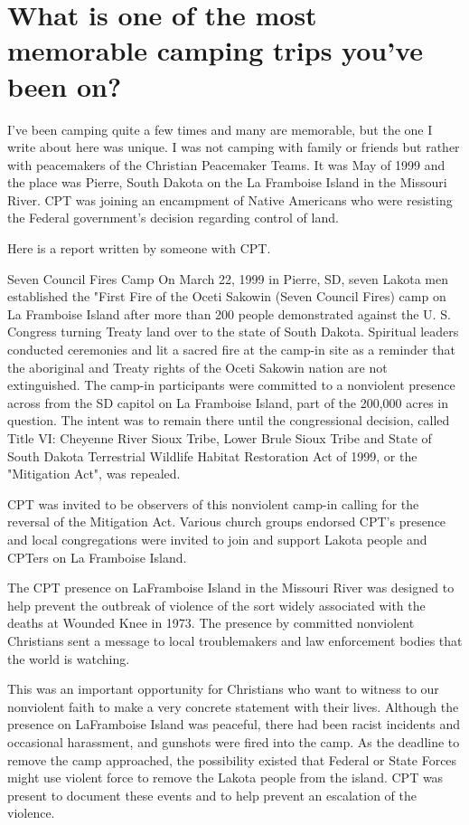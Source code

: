 \section{What is one of the most memorable camping trips you've been on?}
I've been camping quite a few times and many are memorable, but the one I write about here was unique.
I was not camping with family or friends but rather with peacemakers of the Christian Peacemaker Teams.
It was May of 1999 and the place was Pierre, South Dakota on the La Framboise Island in the Missouri River.
CPT was joining an encampment of Native Americans who were resisting the Federal government's decision regarding control of land.

Here is a report written by someone with CPT.

Seven Council Fires Camp
On March 22, 1999 in Pierre, SD, seven Lakota men established the "First Fire of the Oceti Sakowin (Seven Council Fires) camp on La Framboise Island after more than 200 people demonstrated against the U.
S.
Congress turning Treaty land over to the state of South Dakota.
Spiritual leaders conducted ceremonies and lit a sacred fire at the camp-in site as a reminder that the aboriginal and Treaty rights of the Oceti Sakowin nation are not extinguished.
The camp-in participants were committed to a nonviolent presence across from the SD capitol on La Framboise Island, part of the 200,000 acres in question.
The intent was to remain there until the congressional decision, called Title VI: Cheyenne River Sioux Tribe, Lower Brule Sioux Tribe and State of South Dakota Terrestrial Wildlife Habitat Restoration Act of 1999, or the "Mitigation Act", was repealed.

CPT was invited to be observers of this nonviolent camp-in calling for the reversal of the Mitigation Act.
Various church groups endorsed CPT's presence and local congregations were invited to join and support Lakota people and CPTers on La Framboise Island.

The CPT presence on LaFramboise Island in the Missouri River was designed to help prevent the outbreak of violence of the sort widely associated with the deaths at Wounded Knee in 1973.
The presence by committed nonviolent Christians sent a message to local troublemakers and law enforcement bodies that the world is watching.


This was an important opportunity for Christians who want to witness to our nonviolent faith to make a very concrete statement with their lives.
Although the presence on LaFramboise Island was peaceful, there had been racist incidents and occasional harassment, and gunshots were fired into the camp.
As the deadline to remove the camp approached, the possibility existed that Federal or State Forces might use violent force to remove the Lakota people from the island.
CPT was present to document these events and to help prevent an escalation of the violence.


